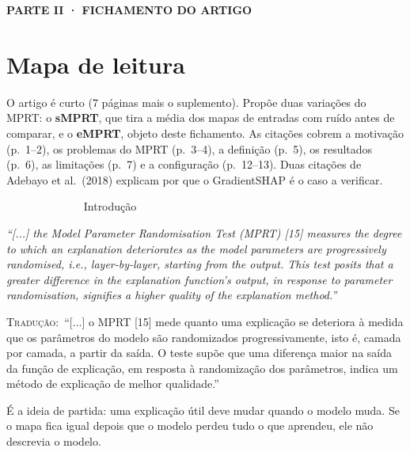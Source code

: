 \documentclass[11pt,a4paper]{article}
\newcommand{\pagechip}[1]{{\setlength{\fboxsep}{1.5pt}\colorbox{cAcc}{\textcolor{white}{\scriptsize\texttt{#1}}}}}
\newcommand{\partbar}[1]{\par\vspace{1.2em}\noindent\colorbox{black!80}{\parbox{\dimexpr\linewidth-2\fboxsep}{\color{white}\bfseries\sffamily\MakeUppercase{#1}}}\par\vspace{0.4em}}
\newenvironment{origquote}{\par\itshape\small}{\par}
\newenvironment{tradquote}{\par\small\textsc{Tradução:}\ }{\par}
\newcommand{\explab}[1]{\par\smallskip{\small\color{cAcc}\textbf{\MakeUppercase{#1}}}\par}
\begin{document}
\partbar{Parte II · Fichamento do artigo}

\section{Mapa de leitura}
O artigo é curto (7 páginas mais o suplemento). Propõe duas variações do MPRT: o \textbf{sMPRT}, que tira a média dos mapas de entradas com ruído antes de comparar, e o \textbf{eMPRT}, objeto deste fichamento. As citações cobrem a motivação (p.~1--2), os problemas do MPRT (p.~3--4), a definição (p.~5), os resultados (p.~6), as limitações (p.~7) e a configuração (p.~12--13). Duas citações de Adebayo et al.\ (2018) explicam por que o GradientSHAP é o caso a verificar.

\begin{citacard}{\pagechip{Hedström p. 1} Introdução}
\begin{origquote}“[...] the Model Parameter Randomisation Test (MPRT) [15] measures the degree to which an explanation deteriorates as the model parameters are progressively randomised, i.e., layer-by-layer, starting from the output. This test posits that a greater difference in the explanation function's output, in response to parameter randomisation, signifies a higher quality of the explanation method.”\end{origquote}
\begin{tradquote}“[...] o MPRT [15] mede quanto uma explicação se deteriora à medida que os parâmetros do modelo são randomizados progressivamente, isto é, camada por camada, a partir da saída. O teste supõe que uma diferença maior na saída da função de explicação, em resposta à randomização dos parâmetros, indica um método de explicação de melhor qualidade.”\end{tradquote}
\explab{Explicação}
É a ideia de partida: uma explicação útil deve mudar quando o modelo muda. Se o mapa fica igual depois que o modelo perdeu tudo o que aprendeu, ele não descrevia o modelo.
\end{citacard}
\end{document}
